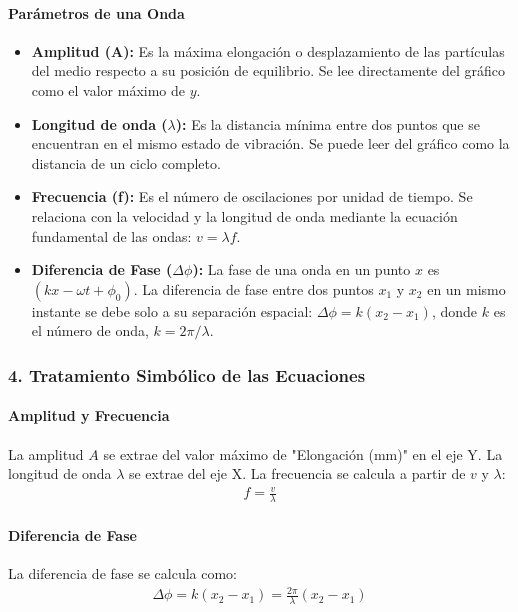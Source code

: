 \paragraph*{Parámetros de una Onda}
\begin{itemize}
    \item \textbf{Amplitud (A):} Es la máxima elongación o desplazamiento de las partículas del medio respecto a su posición de equilibrio. Se lee directamente del gráfico como el valor máximo de $y$.
    \item \textbf{Longitud de onda ($\lambda$):} Es la distancia mínima entre dos puntos que se encuentran en el mismo estado de vibración. Se puede leer del gráfico como la distancia de un ciclo completo.
    \item \textbf{Frecuencia (f):} Es el número de oscilaciones por unidad de tiempo. Se relaciona con la velocidad y la longitud de onda mediante la ecuación fundamental de las ondas: $v = \lambda f$.
    \item \textbf{Diferencia de Fase ($\Delta\phi$):} La fase de una onda en un punto $x$ es $(kx - \omega t + \phi_0)$. La diferencia de fase entre dos puntos $x_1$ y $x_2$ en un mismo instante se debe solo a su separación espacial: $\Delta\phi = k(x_2 - x_1)$, donde $k$ es el número de onda, $k=2\pi/\lambda$.
\end{itemize}

\subsubsection*{4. Tratamiento Simbólico de las Ecuaciones}
\paragraph*{Amplitud y Frecuencia}
La amplitud $A$ se extrae del valor máximo de "Elongación (mm)" en el eje Y.
La longitud de onda $\lambda$ se extrae del eje X.
La frecuencia se calcula a partir de $v$ y $\lambda$:
\begin{gather}
    f = \frac{v}{\lambda}
\end{gather}
\paragraph*{Diferencia de Fase}
La diferencia de fase se calcula como:
\begin{gather}
    \Delta\phi = k(x_2-x_1) = \frac{2\pi}{\lambda}(x_2-x_1)
\end{gather}

